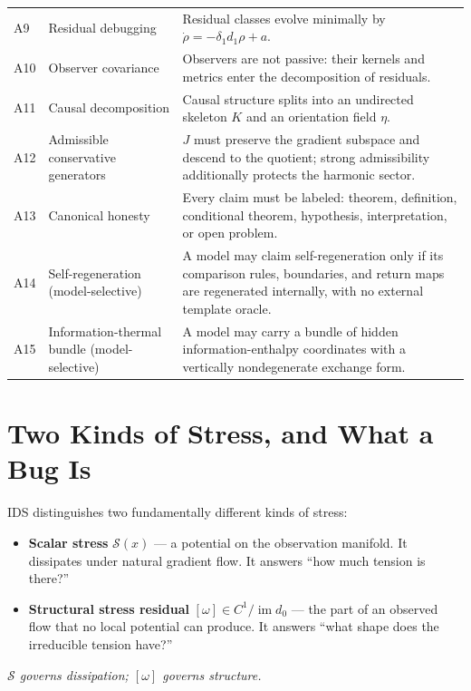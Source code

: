 \documentclass[11pt,a4paper]{article}
\newenvironment{canonbox}{\begin{mdframed}[style=canon]\itshape}{\end{mdframed}}
\theoremstyle{plain}
\begin{document}
\begin{small}
\begin{xltabular}{\textwidth}{@{}l >{\RaggedRight}p{3.4cm} Y@{}}
A9 & Residual debugging & Residual classes evolve minimally by $\dot\rho=-\delta_1d_1\rho+a$. \\
A10 & Observer covariance & Observers are not passive: their kernels and metrics enter the decomposition of residuals. \\
A11 & Causal decomposition & Causal structure splits into an undirected skeleton $K$ and an orientation field $\eta$. \\
A12 & Admissible conservative generators & $J$ must preserve the gradient subspace and descend to the quotient; strong admissibility additionally protects the harmonic sector. \\
A13 & Canonical honesty & Every claim must be labeled: theorem, definition, conditional theorem, hypothesis, interpretation, or open problem. \\
A14 & Self-regeneration (model-selective) & A model may claim self-regeneration only if its comparison rules, boundaries, and return maps are regenerated internally, with no external template oracle. \\
A15 & Information-thermal bundle (model-selective) & A model may carry a bundle of hidden information-enthalpy coordinates with a vertically nondegenerate exchange form. \\
\end{xltabular}
\end{small}

\section{Two Kinds of Stress, and What a Bug Is}\label{sec:stress}

IDS distinguishes two fundamentally different kinds of stress:
\begin{itemize}[itemsep=1pt,topsep=3pt]
\item \textbf{Scalar stress} $\mathcal S(x)$ --- a potential on the observation manifold. It dissipates under natural gradient flow. It answers ``how much tension is there?''
\item \textbf{Structural stress residual} $[\omega]\in C^1/\operatorname{im}d_0$ --- the part of an observed flow that no local potential can produce. It answers ``what shape does the irreducible tension have?''
\end{itemize}

\begin{canonbox}
$\mathcal S$ governs dissipation; $[\omega]$ governs structure.
\end{canonbox}
\end{document}
